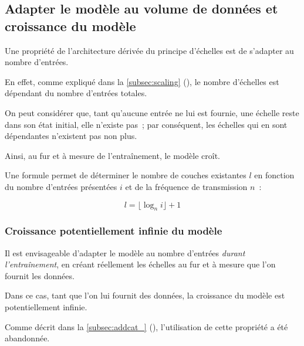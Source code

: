 {\subsection{Adapter le modèle au volume de données et croissance du modèle}
Une propriété de l'architecture dérivée du principe d'échelles est de s'adapter au nombre d'entrées.

En effet, comme expliqué dans la \autoref{subsec:scaling} (), le nombre d'échelles est dépendant du nombre d'entrées totales. 

On peut considérer que, tant qu'aucune entrée ne lui est fournie, une échelle reste dans son état initial, elle n'\og existe\fg{} pas~; par conséquent, les échelles qui en sont dépendantes n'existent pas non plus.

Ainsi, au fur et à mesure de l'entraînement, le modèle croît.

Une formule permet de déterminer le nombre de couches \og existantes\fg{} $l$ en fonction du nombre d'entrées présentées $i$ et de la fréquence de transmission $n$~:

\[l = \lfloor\log_n i\rfloor + 1\]\label{growth_formula}

\subsubsection{Croissance potentiellement infinie du modèle}\label{inf_growth}
Il est envisageable d'adapter le modèle au nombre d'entrées \textit{durant l'entraînement}, en créant réellement les échelles au fur et à mesure que l’on fournit les données.

Dans ce cas, tant que l'on lui fournit des données, la croissance du modèle est potentiellement infinie.

Comme décrit dans la \autoref{subsec:addcat_} (), l'utilisation de cette propriété a été abandonnée.

%
%	
}
